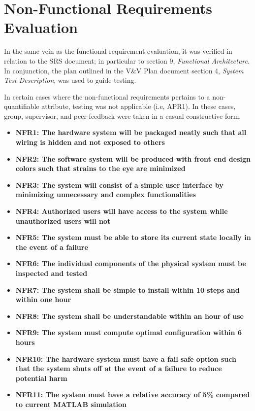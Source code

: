 \documentclass[12pt, titlepage]{article}
\begin{document}
\section{Non-Functional Requirements Evaluation}
In the same vein as the functional requirement evaluation, it was verified in relation to the SRS document; in particular to section 9, \emph{Functional Architecture}. In conjunction, the plan outlined in the V\&V Plan document section 4, \emph{System Test Description}, was used to guide testing.
\par
In certain cases where the non-functional requirements pertains to a non-quantifiable attribute, testing was not applicable (i.e, APR1). In these cases, group, supervisor, and peer feedback were taken in a casual constructive form.

\begin{center}
    \begin{itemize}
        \item \textbf{NFR1: The hardware system will be packaged neatly such that all wiring is hidden and not exposed to others}
        \item \textbf{NFR2: The software system will be produced with front end design colors such that strains to the eye are minimized}
        \item \textbf{NFR3: The system will consist of a simple user interface by minimizing unnecessary and complex functionalities}
        \item \textbf{NFR4: Authorized users will have access to the system while unauthorized users will not}
        \item \textbf{NFR5: The system must be able to store its current state locally in the event of a failure}
        \item \textbf{NFR6: The individual components of the physical system must be inspected and tested}
        \item \textbf{NFR7: The system shall be simple to install within 10 steps and within one hour}
        \item \textbf{NFR8: The system shall be understandable within an hour of use}
        \item \textbf{NFR9: The system must compute optimal configuration within 6 hours}
        \item \textbf{NFR10: The hardware system must have a fail safe option such that the system shuts off at the event of a failure to reduce potential harm}
        \item \textbf{NFR11: The system must have a relative accuracy of 5\% compared to current MATLAB simulation}

\end{itemize}
\end{center}
\end{document}
